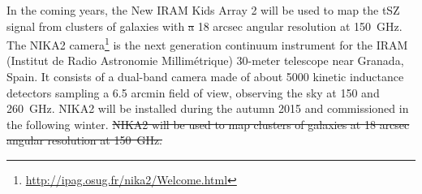 \documentclass[twocolumn,traditabstract]{aa}
\providecommand{\DIFaddtex}[1]{{\protect\color{blue}\uwave{#1}}} %
\providecommand{\DIFdeltex}[1]{{\protect\color{red}\sout{#1}}}                      %
\providecommand{\DIFaddbegin}{} %
\providecommand{\DIFaddend}{} %
\providecommand{\DIFdelbegin}{} %
\providecommand{\DIFdelend}{} %
\providecommand{\DIFadd}[1]{\texorpdfstring{\DIFaddtex{#1}}{#1}} %
\providecommand{\DIFdel}[1]{\texorpdfstring{\DIFdeltex{#1}}{}} %
\begin{document}
In the coming years, the New IRAM Kids Array 2 \citep[NIKA2][]{monfardini2014} will be used to map the tSZ signal from clusters of galaxies with \DIFdelbegin \DIFdel{a }\DIFdelend \DIFaddbegin \DIFadd{an }\DIFaddend 18 arcsec angular resolution at 150~GHz. The NIKA2 camera\footnote{\url{http://ipag.osug.fr/nika2/Welcome.html}} is the next generation continuum instrument for the IRAM (Institut de Radio Astronomie Millim\'etrique) 30-meter telescope near Granada, Spain. It consists of a dual-band camera made of about 5000 kinetic inductance detectors sampling a 6.5 arcmin field of view, observing the sky at 150 and 260~GHz. NIKA2 will be installed during the autumn 2015 and commissioned in the following winter. 
\DIFdelbegin \DIFdel{NIKA2 will be used to map clusters of galaxies at 18 arcsec angular resolution at 150~GHz. 
}%
\end{document}
